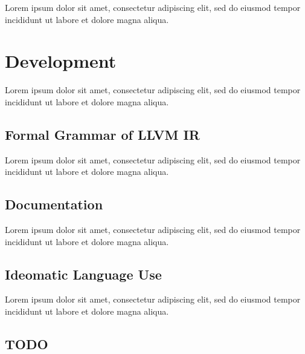 \documentclass[12pt, a4paper]{article}
\begin{document}
Lorem ipsum dolor sit amet, consectetur adipiscing elit, sed do eiusmod tempor incididunt ut labore et dolore magna aliqua.



\section{Development}

Lorem ipsum dolor sit amet, consectetur adipiscing elit, sed do eiusmod tempor incididunt ut labore et dolore magna aliqua.


\subsection{Formal Grammar of LLVM IR}

Lorem ipsum dolor sit amet, consectetur adipiscing elit, sed do eiusmod tempor incididunt ut labore et dolore magna aliqua.


\subsection{Documentation}

Lorem ipsum dolor sit amet, consectetur adipiscing elit, sed do eiusmod tempor incididunt ut labore et dolore magna aliqua.


\subsection{Ideomatic Language Use}

Lorem ipsum dolor sit amet, consectetur adipiscing elit, sed do eiusmod tempor incididunt ut labore et dolore magna aliqua.


\subsection{TODO}
\end{document}
